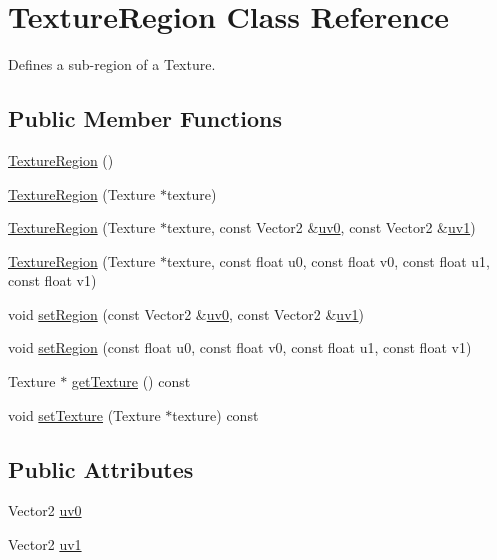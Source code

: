 \hypertarget{class_texture_region}{\section{Texture\+Region Class Reference}
\label{class_texture_region}
}


Defines a sub-\/region of a Texture.  


\subsection*{Public Member Functions}
\begin{DoxyCompactItemize}
\item 
\hyperlink{class_texture_region_a89bb8b66d1ae4c63e4382f97e5634c6a}{Texture\+Region} ()
\item 
\hyperlink{class_texture_region_a774026718faac265657f04b514304862}{Texture\+Region} (Texture $\ast$texture)
\item 
\hyperlink{class_texture_region_a022d7c52f955809eddbf142087390f41}{Texture\+Region} (Texture $\ast$texture, const Vector2 \&\hyperlink{class_texture_region_a5cc46b970a98f4914a1a02f5e8fc74a9}{uv0}, const Vector2 \&\hyperlink{class_texture_region_a33813851075ba1209a289d6b6be4004a}{uv1})
\item 
\hyperlink{class_texture_region_a6a88b03420dd5b746da29268a221e4e3}{Texture\+Region} (Texture $\ast$texture, const float u0, const float v0, const float u1, const float v1)
\item 
void \hyperlink{class_texture_region_ae1417fa3404f73f8b4a7dab621e543f3}{set\+Region} (const Vector2 \&\hyperlink{class_texture_region_a5cc46b970a98f4914a1a02f5e8fc74a9}{uv0}, const Vector2 \&\hyperlink{class_texture_region_a33813851075ba1209a289d6b6be4004a}{uv1})
\item 
void \hyperlink{class_texture_region_a22332d8004d920a33cc9ef04ee67ee1f}{set\+Region} (const float u0, const float v0, const float u1, const float v1)
\item 
Texture $\ast$ \hyperlink{class_texture_region_ae01540b88edcfdc565b5ec06709c6cdd}{get\+Texture} () const 
\item 
void \hyperlink{class_texture_region_a4402c0ee8816e60bc25d324a47c149f9}{set\+Texture} (Texture $\ast$texture) const 
\end{DoxyCompactItemize}
\subsection*{Public Attributes}
\begin{DoxyCompactItemize}
\item 
Vector2 \hyperlink{class_texture_region_a5cc46b970a98f4914a1a02f5e8fc74a9}{uv0}
\item 
Vector2 \hyperlink{class_texture_region_a33813851075ba1209a289d6b6be4004a}{uv1}
\end{DoxyCompactItemize}


